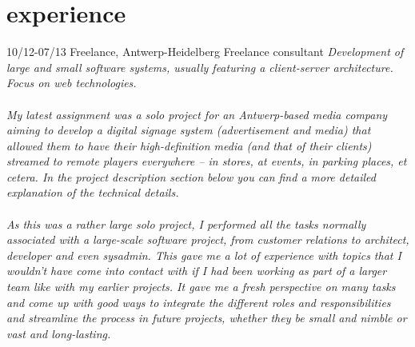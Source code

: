 \documentclass[]{friggeri-cv}
\begin{document}
\section{experience}

\begin{entrylist}
  \entry
    {10/12-07/13}
    {Freelance, Antwerp-Heidelberg}
    {Freelance consultant}
    {\emph{Development of large and small software systems, usually featuring a client-server architecture. Focus on web technologies. \\\\ My latest assignment was a solo project for an Antwerp-based media company aiming to develop a digital signage system (advertisement and media) that allowed them to have their high-definition media (and that of their clients) streamed to remote players everywhere -- in stores, at events, in parking places, et cetera. In the project description section below you can find a more detailed explanation of the technical details. \\\\ As this was a rather large solo project, I performed all the tasks normally associated with a large-scale software project, from customer relations to architect, developer and even sysadmin. This gave me a lot of experience with topics that I wouldn't have come into contact with if I had been working as part of a larger team like with my earlier projects. It gave me a fresh perspective on many tasks and come up with good ways to integrate the different roles and responsibilities and streamline the process in future projects, whether they be small and nimble or vast and long-lasting.
    }}
\end{entrylist}

\end{document}
